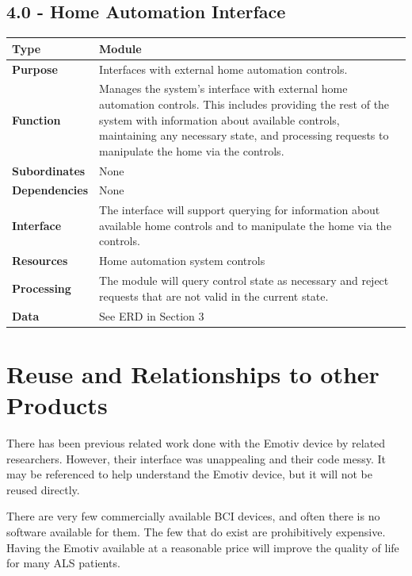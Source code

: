 \documentclass{article}
\begin{document}
\subsection*{4.0 - Home Automation Interface}
\begin{tabular}{ | l |  p{13.3cm} |}
\hline
\textbf{Type} & Module \\ \hline
\textbf{Purpose} & Interfaces with external home automation controls. \\ \hline
\textbf{Function} & Manages the system's interface with external home
automation controls. This includes providing the rest of the system with
information about available controls, maintaining any necessary state, and
processing requests to manipulate the home via the controls. \\ \hline
\textbf{Subordinates} & None \\ \hline
\textbf{Dependencies} & None \\ \hline
\textbf{Interface} & The interface will support querying for information about
available home controls and to manipulate the home via the controls. \\ \hline
\textbf{Resources} & Home automation system controls \\ \hline
\textbf{Processing} & The module will query control state as necessary and
reject requests that are not valid in the current state. \\ \hline
\textbf{Data} & See ERD in Section 3 \\ \hline
\end{tabular}

\newpage

\section{Reuse and Relationships to other Products}
\label{sec:ReuseRel}

There has been previous related work done with the Emotiv device by related
researchers. However, their interface was unappealing and their code messy. It
may be referenced to help understand the Emotiv device, but it will not be
reused directly.

There are very few commercially available BCI devices, and often there is no
software available for them. The few that do exist are prohibitively
expensive. Having the Emotiv available at a reasonable price will improve the
quality of life for many ALS patients.

\newpage
\end{document}
